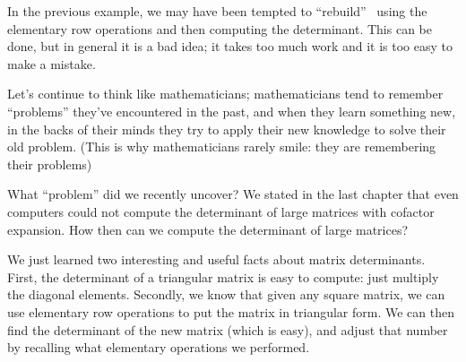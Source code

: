 \medskip

In the previous example, we may have been tempted to ``rebuild'' \tta\ using the elementary row operations and then computing the determinant. This can be done, but in general it is a bad idea; it takes too much work and it is too easy to make a mistake. 


Let's continue to think like mathematicians; mathematicians tend to remember ``problems'' they've encountered in the past, and when they learn something new, in the backs of their minds they try to apply their new knowledge to solve their old problem. (This is why mathematicians rarely smile: they are remembering their problems)

What ``problem'' did we recently uncover? We stated in the last chapter that even computers could not compute the determinant of large matrices with cofactor expansion. How then can we compute the determinant of large matrices?

We just learned two interesting and useful facts about matrix determinants. First, the determinant of a triangular matrix is easy to compute: just multiply the diagonal elements. Secondly, we know that given any square matrix, we can use elementary row operations to put the matrix in triangular form.  We can then find the determinant of the new matrix (which is easy), and adjust that number by recalling what elementary operations we performed. 

\medskip

